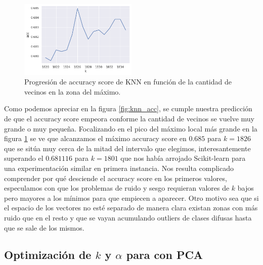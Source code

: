 \begin{figure}[h]
\includegraphics[width=0.5\textwidth]{./img/knn2.png}
\centering
\caption{Progresión de accuracy score de KNN en función de la cantidad de vecinos en la zona del máximo.\label{fig:knn_acc_2}}

\end{figure}

Como podemos apreciar en la figura \ref{fig:knn_acc}, se cumple nuestra predicción de que el accuracy score empeora conforme la cantidad de vecinos se vuelve muy grande o muy pequeña. Focalizando en el pico del máximo local más grande en la figura \ref{fig:knn_acc_2} se ve que alcanzamos el máximo accuracy score en $0.685$ para $k=1826$ que se sitúa muy cerca de la mitad del intervalo que elegimos, interesantemente superando el $0.681116$ para $k=1801$ que nos había arrojado Scikit-learn para una experimentación similar en primera instancia. Nos resulta complicado comprender por qué desciende el accuracy score en los primeros valores, especulamos con que los problemas de ruido y sesgo requieran valores de $k$ bajos pero mayores a los mínimos para que empiecen a aparecer. Otro motivo sea que si el espacio de los vectores no esté separado de manera clara existan zonas con más ruido que en el resto y que se vayan acumulando outliers de clases difusas hasta que se sale de los mismos.

\subsection{Optimización de $k$ y $\alpha$ para \knn{} con PCA}%
\label{sub:alpha_k_knn_pca}

